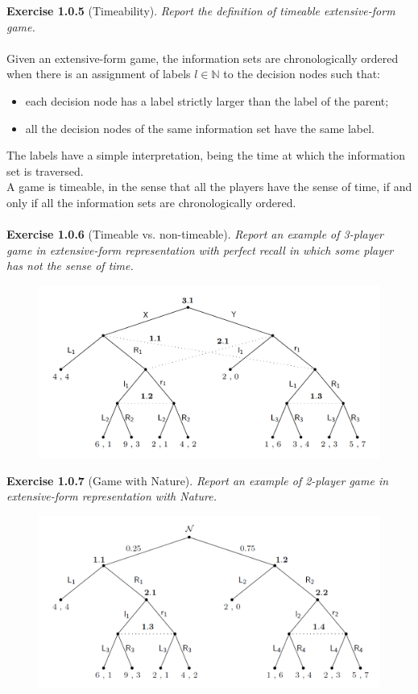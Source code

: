 \noindent
\textbf{Exercise 1.0.5} (Timeability). \textit{Report the definition of timeable extensive-form game.}\\\\
Given an extensive-form game, the information sets are chronologically ordered when there is an assignment of labels $l \in \mathbb{N}$ to the decision nodes such that:
\begin{itemize}
\item each decision node has a label strictly larger than the label of the parent;
\item all the decision nodes of the same information set have the same label.
\end{itemize}
The labels have a simple interpretation, being the time at which the information set is traversed.\\
A game is timeable, in the sense that all the players have the sense of time, if and only if all the information sets are chronologically ordered.\\\\
\textbf{Exercise 1.0.6} (Timeable vs. non-timeable). \textit{Report an example of 3-player game in extensive-form representation
with perfect recall in which some player has not the sense of time.}
\begin{figure}[H]
\centering
\includegraphics[width=\textwidth]{images/img_1_1_05.png}
\end{figure}
\noindent
\textbf{Exercise 1.0.7} (Game with Nature). \textit{Report an example of 2-player game in extensive-form representation
with Nature.}
\begin{figure}[H]
\centering
\includegraphics[width=\textwidth]{images/img_1_1_06.png}
\end{figure}
